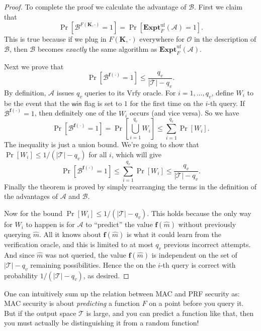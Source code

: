 \documentclass[11pt]{article}
\newcommand{\Vrfy}{\mathrm{Vrfy}}
\newcommand{\tags}{\mathcal{T}}
\newcommand{\win}{\mathsf{win}}
\newcommand{\calA}{\mathcal{A}}
\newcommand{\calB}{\mathcal{B}}
\newcommand{\calO}{\mathcal{O}}
\newcommand{\bK}{\mathbf{K}}
\newcommand{\bof}{\mathbf{f}}
\newcommand{\hatm}{\hat{m}}
\newcommand{\ExptUF}{\mathbf{Expt}^{\mathrm{uf}}}
\begin{document}
\begin{proof}
    To complete the proof we calculate the advantage of $\calB$. First we
    claim that
    \[
        \Pr[\calB^{F(\bK,\cdot)}=1] = \Pr[\ExptUF_F(\calA)=1].
    \]
    This is true because if we plug in $F(\bK,\cdot)$ everywhere for $\calO$ in
    the description of $\calB$, then $\calB$ becomes \emph{exactly} the same
    algorithm as $\ExptUF_F(\calA)$.
    
    Next we prove that
    \[
        \Pr[\calB^{\bof(\cdot)}=1] \leq \frac{q_v}{|\tags|-q_v}.
    \]
    By definition, $\calA$ issues $q_v$
    queries to its $\Vrfy$ oracle. For $i=1,\ldots,q_v$, define 
    $W_i$ to be the event that the $\win$ flag is set to $1$ for the
    first time on the $i$-th
    query. If $\calB^{\bof(\cdot)}=1$, then definitely one of the $W_i$
    occurs (and vice versa). So we have
    \[
        \Pr[\calB^{\bof(\cdot)}=1] = \Pr[\bigcup_{i=1}^{q_v} W_i] \leq
        \sum_{i=1}^{q_v}\Pr[W_i].
    \]
    The inequality is just a union bound. We're going to show that $\Pr[W_i]
    \leq 1/(|\tags|-q_v)$ for all $i$, which will give
    \[
        \Pr[\calB^{\bof(\cdot)}=1] \leq
        \sum_{i=1}^{q_v}\Pr[W_i] \leq \frac{q_v}{|\tags|-q_v}.
    \]
    Finally the theorem is proved by simply rearranging the terms in the
    definition of the advantages of $\calA$ and $\calB$.

    Now for the bound $\Pr[W_i]\leq 1/(|\tags|-q_v)$. This holds because the only way
    for $W_i$ to happen is for $\calA$ to ``predict'' the value $\bof(\hatm)$
    without previously querying $\hatm$. All it knows about $\bof(\hatm)$ is
    what it could learn from the verification oracle, and this is limited
    to at most $q_v$ previous incorrect attempts.
    And since $\hatm$ was not queried, the
    value $\bof(\hatm)$ is independent on the set of $|\tags|-q_v$ remaining
    possibilities. Hence
    the on the $i$-th query is correct with
    probability $1/(|\tags|-q_v)$, as desired.
\end{proof}
One can intuitively sum up the relation between MAC and PRF security as: MAC
security is about \emph{predicting} a function $F$ on a point before you query
it. But if the output space $\tags$ is large, and you can predict a function
like that, then you must actually be distinguishing it from a random function!
\end{document}
